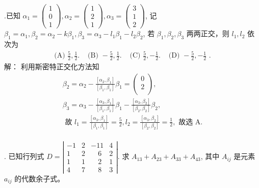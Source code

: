 \documentclass{article}
\begin{document}
\vspace{1ex}
{.}已知 $\alpha_{1}=\left(\begin{array}{l}1  \\ 0  \\ 1\end{array}\right), \alpha_{2}=\left(\begin{array}{l}1  \\ 2  \\ 1\end{array}\right), \alpha_{3}=\left(\begin{array}{l}3  \\ 1  \\ 2\end{array}\right)$, 记 $\beta_{1}=\alpha_{1}, \beta_{2}=\alpha_{2}-k \beta_{1}, \beta_{3}=\alpha_{3}-l_{1} \beta_{1}-l_{2} \beta_{2}$,
若 $\beta_{1}, \beta_{2},\beta_{3}$ 两两正交，则 $l_{1}, l_{2}$ 依次为 \\
$$\begin{array}{llll}\text { (A) } \frac{5}{2}, \frac{1}{2} . & \text { (B) }-\frac{5}{2}, \frac{1}{2} . & \text { (C) } \frac{5}{2},-\frac{1}{2} . & \text { (D) }-\frac{5}{2},-\frac{1}{2} \text { . }\end{array}$$
解： 利用斯密特正交化方法知
$$\begin{array}{c}
        \beta_{2}=\alpha_{2}-\frac{\left[\alpha_{2}, \beta_{1}\right]}{\left[\beta_{1}, \beta_{1}\right]} \beta_{1}=\left(\begin{array}{l}
                0 \\
                2 \\
            \end{array}\right),                                                \\
        \beta_{3}=\alpha_{3}-\frac{\left[\alpha_{3}, \beta_{1}\right]}{\left[\beta_{1}, \beta_{1}\right]} \beta_{1}-\frac{\left[\alpha_{3}, \beta_{2}\right]}{\left[\beta_{2}, \beta_{2}\right]} \beta_{2}, \\
        \text { 故 } l_{1}=\frac{\left[\alpha_{3}, \beta_{1}\right]}{\left[\beta_{1}, \beta_{1}\right]}=\frac{5}{2}, l_{2}=\frac{\left[\alpha_{3}, \beta_{2}\right]}{\left[\beta_{2}, \beta_{2}\right]}=\frac{1}{2}, \text { 故选 } \mathrm{A} .
    \end{array}$$ \\

\vspace{1ex}
{.} 已知行列式 $D=\left|\begin{array}{llll}-1 & 2 & -11 & 4  \\ 1 & 2 & \quad6 & 2  \\ 1 & 1 & \quad2 & 1  \\ 4 & 7 & \quad8 & 3\end{array}\right| .$ 求 $A_{13}+A_{23}+A_{33}+A_{43}$, 其中 $A_{ij}$ 是元素
$a_{ij}$ 的代数余子式。
\end{document}
